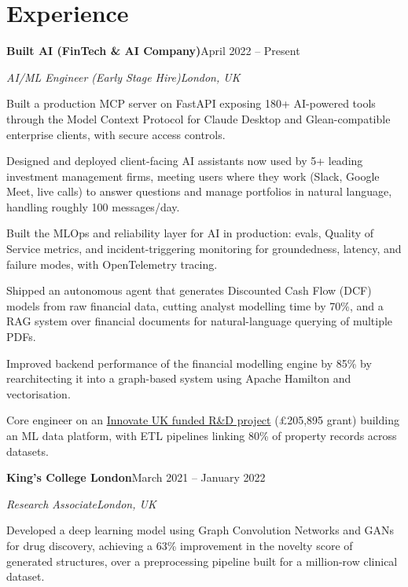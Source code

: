 \documentclass[10pt,a4paper]{article}
\newcommand{\entry}[4]{%
  {\color{company}\bfseries #1}\hfill {\color{muted}#2}\par
  \vspace{1pt}
  {\itshape #3}\hfill {\color{muted}\itshape #4}\par
  \vspace{3pt}%
}
\begin{document}
\section{Experience}
\entry{Built AI (FinTech \& AI Company)}{April 2022 -- Present}{AI/ML Engineer (Early Stage Hire)}{London, UK}
\begin{tight}
  \item Built a production MCP server on FastAPI exposing 180+ AI-powered tools through the Model Context Protocol for Claude Desktop and Glean-compatible enterprise clients, with secure access controls.
  \item Designed and deployed client-facing AI assistants now used by 5+ leading investment management firms, meeting users where they work (Slack, Google Meet, live calls) to answer questions and manage portfolios in natural language, handling roughly 100 messages/day.
  \item Built the MLOps and reliability layer for AI in production: evals, Quality of Service metrics, and incident-triggering monitoring for groundedness, latency, and failure modes, with OpenTelemetry tracing.
  \item Shipped an autonomous agent that generates Discounted Cash Flow (DCF) models from raw financial data, cutting analyst modelling time by 70\%, and a RAG system over financial documents for natural-language querying of multiple PDFs.
  \item Improved backend performance of the financial modelling engine by 85\% by rearchitecting it into a graph-based system using Apache Hamilton and vectorisation.
  \item Core engineer on an \href{https://gtr.ukri.org/projects?ref=10022996}{Innovate UK funded R\&D project} (\pounds205,895 grant) building an ML data platform, with ETL pipelines linking 80\% of property records across datasets.
\end{tight}

\entry{King's College London}{March 2021 -- January 2022}{Research Associate}{London, UK}
\begin{tight}
  \item Developed a deep learning model using Graph Convolution Networks and GANs for drug discovery, achieving a 63\% improvement in the novelty score of generated structures, over a preprocessing pipeline built for a million-row clinical dataset.
\end{tight}

\end{document}
